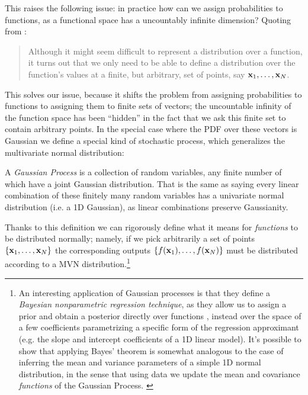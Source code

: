 This raises the following issue: in practice how can we assign probabilities to functions, as a functional space has a uncountably infinite dimension?
Quoting from \cite{ml_probabilistic_perspective}:
\begin{quote}
    Although it might seem difficult to represent a distribution over a function, it turns out that we only need to be able to define a distribution over the function’s values at a finite, but arbitrary, set of points, say $\vb{x}_1, \dots, \vb{x}_N$.
\end{quote}
This solves our issue, because it shifts the problem from assigning probabilities to functions to assigning them to finite sets of vectors; the uncountable infinity of the function space has been ``hidden'' in the fact that we ask this finite set to contain arbitrary points. In the special case where the PDF over these vectors is Gaussian we define a special kind of stochastic process, which generalizes the multivariate normal distribution:
\begin{definition}
    A \emph{Gaussian Process} is a collection of random variables, any finite number of which have a joint Gaussian distribution. \cite{gaussian_processes_ml}
    That is the same as saying every linear combination of these finitely many random variables has a univariate normal distribution (i.e. a 1D Gaussian), as linear combinations preserve Gaussianity. \cite{gaussian_processes_ml}
\end{definition}
Thanks to this definition we can rigorously define what it means for \emph{functions} to be distributed normally; namely, if we pick arbitrarily a set of points $\{\vb{x}_1, \dots, \vb{x}_N\}$ the corresponding outputs $\{f(\vb{x}_1), \dots, f(\vb{x}_N)\}$ must be distributed according to a MVN distribution.\footnote{An interesting application of Gaussian processes is that they define a \emph{Bayesian nonparametric regression technique}, as they allow us to assign a prior and obtain a posterior directly over functions \cite{ml_probabilistic_perspective}, instead over the space of a few coefficients parametrizing a specific form of the regression approximant (e.g. the slope and intercept coefficients of a 1D linear model). It's possible to show that applying Bayes' theorem is somewhat analogous to the case of inferring the mean and variance parameters of a simple 1D normal distribution, in the sense that using data we update the mean and covariance \emph{functions} of the Gaussian Process. \cite{mckay} \cite{gaussian_processes_ml} \cite{ml_probabilistic_perspective}}


